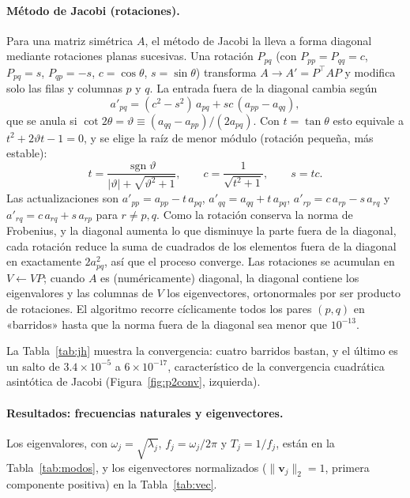 \documentclass[11pt,a4paper]{article}
\newcommand{\vect}[1]{\bm{#1}}
\begin{document}
\paragraph{Método de Jacobi (rotaciones).}
Para una matriz simétrica $A$, el método de Jacobi la lleva a forma diagonal mediante rotaciones planas sucesivas. Una rotación $P_{pq}$ (con $P_{pp}=P_{qq}=c$, $P_{pq}=s$, $P_{qp}=-s$, $c=\cos\theta$, $s=\sin\theta$) transforma $A\to A'=P^\top AP$ y modifica solo las filas y columnas $p$ y $q$. La entrada fuera de la diagonal cambia según
\[
a'_{pq}=(c^2-s^2)\,a_{pq}+sc\,(a_{pp}-a_{qq}),
\]
que se anula si $\cot2\theta=\vartheta\equiv(a_{qq}-a_{pp})/(2a_{pq})$. Con $t=\tan\theta$ esto equivale a $t^2+2\vartheta t-1=0$, y se elige la raíz de menor módulo (rotación pequeña, más estable):
\begin{equation}
t=\frac{\operatorname{sgn}\vartheta}{|\vartheta|+\sqrt{\vartheta^2+1}},\qquad c=\frac1{\sqrt{t^2+1}},\qquad s=tc. \label{eq:jacobi}
\end{equation}
Las actualizaciones son $a'_{pp}=a_{pp}-t\,a_{pq}$, $a'_{qq}=a_{qq}+t\,a_{pq}$, $a'_{rp}=c\,a_{rp}-s\,a_{rq}$ y $a'_{rq}=c\,a_{rq}+s\,a_{rp}$ para $r\ne p,q$. Como la rotación conserva la norma de Frobenius, y la diagonal aumenta lo que disminuye la parte fuera de la diagonal, cada rotación reduce la suma de cuadrados de los elementos fuera de la diagonal en exactamente $2a_{pq}^2$, así que el proceso converge. Las rotaciones se acumulan en $V\leftarrow VP$; cuando $A$ es (numéricamente) diagonal, la diagonal contiene los eigenvalores y las columnas de $V$ los eigenvectores, ortonormales por ser producto de rotaciones. El algoritmo recorre cíclicamente todos los pares $(p,q)$ en «barridos» hasta que la norma fuera de la diagonal sea menor que $10^{-13}$.

La Tabla~\ref{tab:jh} muestra la convergencia: cuatro barridos bastan, y el último es un salto de $3.4\times10^{-5}$ a $6\times10^{-17}$, característico de la convergencia cuadrática asintótica de Jacobi (Figura~\ref{fig:p2conv}, izquierda).

\begin{table}[H]\centering\small

\caption{Norma de Frobenius de la parte fuera de la diagonal tras cada barrido de Jacobi.}\label{tab:jh}
\end{table}

\paragraph{Resultados: frecuencias naturales y eigenvectores.}
Los eigenvalores, con $\omega_j=\sqrt{\lambda_j}$, $f_j=\omega_j/2\pi$ y $T_j=1/f_j$, están en la Tabla~\ref{tab:modos}, y los eigenvectores normalizados ($\|\vect v_j\|_2=1$, primera componente positiva) en la Tabla~\ref{tab:vec}.
\end{document}
